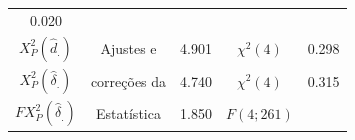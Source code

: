 \documentclass[]{book}
\numberwithin{example}{chapter}
\numberwithin{remark}{chapter}
\numberwithin{definition}{chapter}
\begin{document}
\begin{longtable}[]{@{}cclcr@{}}
\begin{minipage}[t]{0.08\columnwidth}
0.020\strut
\end{minipage}\tabularnewline
\begin{minipage}[t]{0.39\columnwidth}\centering\strut
\(X_{P}^{2}\left( \hat{d}_{.}\right)\)\strut
\end{minipage} & \begin{minipage}[t]{0.15\columnwidth}\centering\strut
Ajustes e\strut
\end{minipage} & \begin{minipage}[t]{0.05\columnwidth}\raggedright\strut
4.901\strut
\end{minipage} & \begin{minipage}[t]{0.19\columnwidth}\centering\strut
\(\chi ^{2}(4)\)\strut
\end{minipage} & \begin{minipage}[t]{0.08\columnwidth}\raggedleft\strut
0.298\strut
\end{minipage}\tabularnewline
\begin{minipage}[t]{0.39\columnwidth}\centering\strut
\(X_{P}^{2}\left( \hat{\delta}_{.}\right)\)\strut
\end{minipage} & \begin{minipage}[t]{0.15\columnwidth}\centering\strut
correções da\strut
\end{minipage} & \begin{minipage}[t]{0.05\columnwidth}\raggedright\strut
4.740\strut
\end{minipage} & \begin{minipage}[t]{0.19\columnwidth}\centering\strut
\(\chi ^{2}(4)\)\strut
\end{minipage} & \begin{minipage}[t]{0.08\columnwidth}\raggedleft\strut
0.315\strut
\end{minipage}\tabularnewline
\begin{minipage}[t]{0.39\columnwidth}\centering\strut
\(FX_{P}^{2}\left( \hat{\delta}_{.}\right)\)\strut
\end{minipage} & \begin{minipage}[t]{0.15\columnwidth}\centering\strut
Estatística\strut
\end{minipage} & \begin{minipage}[t]{0.05\columnwidth}\raggedright\strut
1.850\strut
\end{minipage} & \begin{minipage}[t]{0.19\columnwidth}\centering\strut
\(F\left( 4;261\right)\)\strut
\end{minipage} & \begin{minipage}[t]{0.08\columnwidth}\raggedleft\strut

\end{minipage}
\end{longtable}
\end{document}
